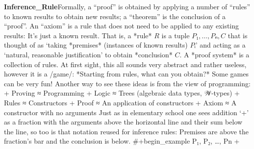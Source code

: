\documentclass[11pt]{article}
\begin{document}
\vspace{1em}\textbf{Inference_Rule}\quad\label{org-special-block-extras-glossary-Inference_Rule}Formally, a “proof” is obtained by applying a number of “rules” to known results to obtain new results; a “theorem” is the conclusion of a “proof”. \quad An “axiom” is a rule that does not need to be applied to any existing results: It's just a known result.  That is, a *rule* $R$ is a tuple $P₁, …, Pₙ, C$ that is thought of as ‘taking *premises* (instances of known results) $Pᵢ$’ and acting as a ‘natural, reasonable justification’ to obtain *conclusion* $C$. \quad A *proof system* is a collection of rules. At first sight, this all sounds very abstract and rather useless, however it is a /game/: *Starting from rules, what can you obtain?* Some games can be very fun! Another way to see these ideas is from the view of programming:  + Proving ≈ Programming + Logic \quad  ≈ Trees (algebraic data types, 𝒲-types) + Rules \quad  ≈ Constructors + Proof \quad  ≈ An application of constructors + Axiom \quad  ≈ A constructor with no arguments  Just as in elementary school one sees addition ‘+’ as a fraction with the arguments above the horizontal line and their sum below the line, so too is that notation reused for inference rules: Premises are above the fraction's bar and the conclusion is below. #+begin_example  \quad  \quad  \quad  \quad  \quad  \quad  \quad  \quad  \quad  \quad  \quad  \quad  \quad  \quad  \quad  \quad  {} P₁, P₂, …, Pn \quad  \quad  \quad  \quad  \quad  \quad  \quad  \quad  \quad  \quad +  
\end{document}

